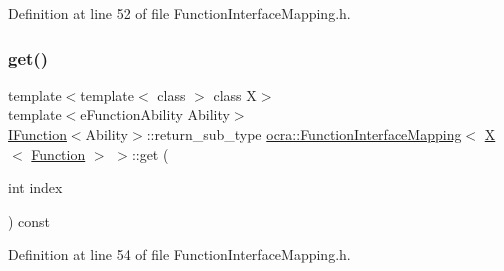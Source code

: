 Definition at line 52 of file Function\+Interface\+Mapping.\+h.

\hypertarget{structocra_1_1FunctionInterfaceMapping_3_01X_3_01Function_01_4_01_4_a6212b1a19d132697be6950665075208e}{}\label{structocra_1_1FunctionInterfaceMapping_3_01X_3_01Function_01_4_01_4_a6212b1a19d132697be6950665075208e} 
\subsubsection{\texorpdfstring{get()}{get()}\hspace{0.1cm}{\footnotesize\ttfamily [2/2]}}
{\footnotesize\ttfamily template$<$template$<$ class $>$ class X$>$ \\
template$<$e\+Function\+Ability Ability$>$ \\
\hyperlink{classocra_1_1IFunction}{I\+Function}$<$Ability$>$\+::return\+\_\+sub\+\_\+type \hyperlink{structocra_1_1FunctionInterfaceMapping}{ocra\+::\+Function\+Interface\+Mapping}$<$ \hyperlink{namespaceocra_a436781c7059a0f76027df1c652126260a53f3cfeeb322946db40cd86dfebfb237}{X}$<$ \hyperlink{classocra_1_1Function}{Function} $>$ $>$\+::get (\begin{DoxyParamCaption}\item[{int}]{index }\end{DoxyParamCaption}) const\hspace{0.3cm}{\ttfamily [inline]}}



Definition at line 54 of file Function\+Interface\+Mapping.\+h.

\hypertarget{structocra_1_1FunctionInterfaceMapping_3_01X_3_01Function_01_4_01_4_a4fa10e2380f7b0933e8a68bdd51d97c7}{}\label{structocra_1_1FunctionInterfaceMapping_3_01X_3_01Function_01_4_01_4_a4fa10e2380f7b0933e8a68bdd51d97c7} 
